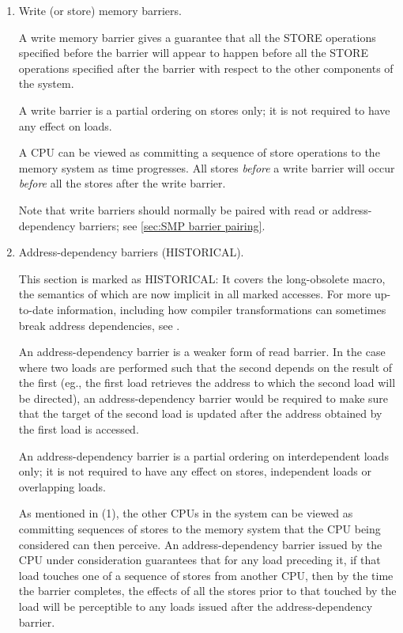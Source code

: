 \begin{enumerate}
 \item
     Write (or store) memory barriers.

     A write memory barrier gives a guarantee that all the STORE operations
     specified before the barrier will appear to happen before all the STORE
     operations specified after the barrier with respect to the other
     components of the system.

     A write barrier is a partial ordering on stores only; it is not required
     to have any effect on loads.

     A CPU can be viewed as committing a sequence of store operations to the
     memory system as time progresses.
     All stores \emph{before} a write barrier will occur \emph{before} all
     the stores after the write barrier.

     \begin{Note}
     Note that write barriers should normally be paired with read or
     address-dependency barriers; see \cref{sec:SMP barrier pairing}.
     \end{Note}


 \item
     Address-dependency barriers (HISTORICAL).

     \begin{Note}
     This section is marked as HISTORICAL\@:
     It covers the long-obsolete  macro,
     the semantics of which are now implicit in all marked accesses.
     For more up-to-date information, including how compiler transformations
     can sometimes break address dependencies, see
     .
     \end{Note}

     An address-dependency barrier is a weaker form of read barrier.
     In the case where two loads are performed such that the second depends
     on the result of the first (eg., the first load retrieves the address
     to which the second load will be directed), an address-dependency
     barrier would be required to make sure that the target of the second
     load is updated after the address obtained by the first load is
     accessed.

     An address-dependency barrier is a partial ordering on interdependent
     loads only; it is not required to have any effect on stores, independent
     loads or overlapping loads.

     As mentioned in (1), the other CPUs in the system can be viewed as
     committing sequences of stores to the memory system that the CPU being
     considered can then perceive.
     An address-dependency barrier issued by the CPU under consideration
     guarantees that for any load preceding it, if that load touches one of
     a sequence of stores from another CPU, then by the time the barrier
     completes, the effects of all the stores prior to that touched by the
     load will be perceptible to any loads issued after the
     address-dependency barrier.


\end{enumerate}
